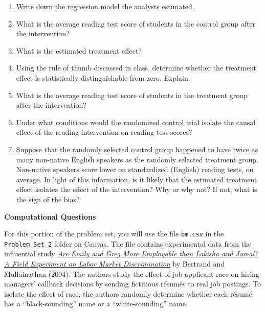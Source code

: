 \documentclass[11pt]{article}
\begin{document}
\begin{onehalfspacing}
\begin{enumerate}
\begin{enumerate}
	\item Write down the regression model the analysts estimated.
	\item What is the average reading test score of students in the control group after the intervention? 
	\item What is the estimated treatment effect? 
	\item Using the rule of thumb discussed in class, determine whether the treatment effect is statistically distinguishable from zero. Explain.
	\item What is the average reading test score of students in the treatment group after the intervention? 
	\item Under what conditions would the randomized control trial isolate the causal effect of the reading intervention on reading test scores?
	\item Suppose that the randomly selected control group happened to have twice as many non-native English speakers as the randomly selected treatment group. Non-native speakers score lower on standardized (English) reading tests, on average. In light of this information, is it likely that the estimated treatment effect isolates the effect of the intervention? Why or why not? If not, what is the sign of the bias?
\end{enumerate}
\end{enumerate}
\clearpage
\begin{center}
\textbf{Computational Questions} \bigskip
\end{center}

\noindent For this portion of the problem set, you will use the file \texttt{bm.csv} in the \texttt{Problem\_Set\_2} folder on Canvas. The file contains experimental data from the influential study \href{https://www.aeaweb.org/articles?id=10.1257/0002828042002561}{\textit{Are Emily and Greg More Employable than Lakisha and Jamal? A Field Experiment on Labor Market Discrimination}} by Bertrand and Mullainathan (2004). The authors study the effect of job applicant race on hiring managers' callback decisions by sending fictitious r\'esum\'es to real job postings. To isolate the effect of race, the authors randomly determine whether each r\'esum\'e has a ``black-sounding'' name or a ``white-sounding'' name.  


\end{onehalfspacing}
\end{document}
